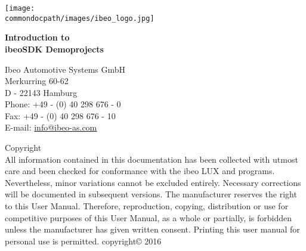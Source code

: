 \newpage
{}
\thispagestyle{plain}

\begin{center}
\vspace*{3cm}
\texttt{[image: \\commondocpath/images/ibeo\_logo.jpg]}
\vspace*{\fill}
\end{center}

\newpage



\thispagestyle{plain}
\vspace*{6cm}
\begin{bfseries}
\begin{huge}
\huge \bfseries \noindent Introduction to\\ [1.5cm]
\huge \bfseries ibeoSDK Demoprojects
\end{huge}
\end{bfseries}
\newpage
\thispagestyle{plain}

\newpage
\begin{bfseries} 
\null
\vfill
\begin{centering}Ibeo Automotive Systems GmbH\\
Merkurring 60-62\\
D - 22143 Hamburg\\
Phone: +49 - (0) 40 298 676 - 0\\
Fax: +49 - (0) 40 298 676 - 10\\
E-mail: \href{mailto:info@ibeo-as.com}{info@ibeo-as.com}
\vspace*{1.0cm}
 
Copyright\\
\mdseries 
All information contained in this documentation has been collected with utmost care and been checked for conformance with the ibeo LUX and programs. Nevertheless, minor variations cannot be excluded entirely. Necessary corrections will be documented in subsequent versions. The manufacturer reserves the right to this User Manual. Therefore, reproduction, copying, distribution or use for competitive purposes of this User Manual, as a whole or partially, is forbidden unless the manufacturer has given written consent.
Printing this user manual for personal use is permitted.
copyright© 2016
\end{centering}
\end{bfseries}

